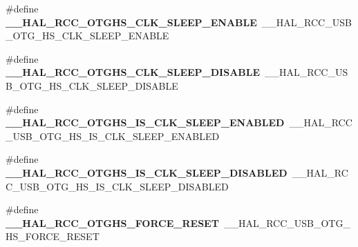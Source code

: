 \begin{DoxyCompactItemize}
\item 
\#define {\bfseries \+\_\+\+\_\+\+H\+A\+L\+\_\+\+R\+C\+C\+\_\+\+O\+T\+G\+H\+S\+\_\+\+C\+L\+K\+\_\+\+S\+L\+E\+E\+P\+\_\+\+E\+N\+A\+B\+LE}~\+\_\+\+\_\+\+H\+A\+L\+\_\+\+R\+C\+C\+\_\+\+U\+S\+B\+\_\+\+O\+T\+G\+\_\+\+H\+S\+\_\+\+C\+L\+K\+\_\+\+S\+L\+E\+E\+P\+\_\+\+E\+N\+A\+B\+LE\hypertarget{group___h_a_l___r_c_c___aliased_ga33ebf3c332b4cc9093720cd9959a57c3}{}\label{group___h_a_l___r_c_c___aliased_ga33ebf3c332b4cc9093720cd9959a57c3}

\item 
\#define {\bfseries \+\_\+\+\_\+\+H\+A\+L\+\_\+\+R\+C\+C\+\_\+\+O\+T\+G\+H\+S\+\_\+\+C\+L\+K\+\_\+\+S\+L\+E\+E\+P\+\_\+\+D\+I\+S\+A\+B\+LE}~\+\_\+\+\_\+\+H\+A\+L\+\_\+\+R\+C\+C\+\_\+\+U\+S\+B\+\_\+\+O\+T\+G\+\_\+\+H\+S\+\_\+\+C\+L\+K\+\_\+\+S\+L\+E\+E\+P\+\_\+\+D\+I\+S\+A\+B\+LE\hypertarget{group___h_a_l___r_c_c___aliased_ga3e46182659039e69ad95eada6df0261e}{}\label{group___h_a_l___r_c_c___aliased_ga3e46182659039e69ad95eada6df0261e}

\item 
\#define {\bfseries \+\_\+\+\_\+\+H\+A\+L\+\_\+\+R\+C\+C\+\_\+\+O\+T\+G\+H\+S\+\_\+\+I\+S\+\_\+\+C\+L\+K\+\_\+\+S\+L\+E\+E\+P\+\_\+\+E\+N\+A\+B\+L\+ED}~\+\_\+\+\_\+\+H\+A\+L\+\_\+\+R\+C\+C\+\_\+\+U\+S\+B\+\_\+\+O\+T\+G\+\_\+\+H\+S\+\_\+\+I\+S\+\_\+\+C\+L\+K\+\_\+\+S\+L\+E\+E\+P\+\_\+\+E\+N\+A\+B\+L\+ED\hypertarget{group___h_a_l___r_c_c___aliased_gadad70bfa003e6cd32f8d16102216c02e}{}\label{group___h_a_l___r_c_c___aliased_gadad70bfa003e6cd32f8d16102216c02e}

\item 
\#define {\bfseries \+\_\+\+\_\+\+H\+A\+L\+\_\+\+R\+C\+C\+\_\+\+O\+T\+G\+H\+S\+\_\+\+I\+S\+\_\+\+C\+L\+K\+\_\+\+S\+L\+E\+E\+P\+\_\+\+D\+I\+S\+A\+B\+L\+ED}~\+\_\+\+\_\+\+H\+A\+L\+\_\+\+R\+C\+C\+\_\+\+U\+S\+B\+\_\+\+O\+T\+G\+\_\+\+H\+S\+\_\+\+I\+S\+\_\+\+C\+L\+K\+\_\+\+S\+L\+E\+E\+P\+\_\+\+D\+I\+S\+A\+B\+L\+ED\hypertarget{group___h_a_l___r_c_c___aliased_gaf3cd4d85b55fc5bfd19d839d315eaa80}{}\label{group___h_a_l___r_c_c___aliased_gaf3cd4d85b55fc5bfd19d839d315eaa80}

\item 
\#define {\bfseries \+\_\+\+\_\+\+H\+A\+L\+\_\+\+R\+C\+C\+\_\+\+O\+T\+G\+H\+S\+\_\+\+F\+O\+R\+C\+E\+\_\+\+R\+E\+S\+ET}~\+\_\+\+\_\+\+H\+A\+L\+\_\+\+R\+C\+C\+\_\+\+U\+S\+B\+\_\+\+O\+T\+G\+\_\+\+H\+S\+\_\+\+F\+O\+R\+C\+E\+\_\+\+R\+E\+S\+ET\hypertarget{group___h_a_l___r_c_c___aliased_gaba098ab8f27b638745864ad795ac250a}{}\label{group___h_a_l___r_c_c___aliased_gaba098ab8f27b638745864ad795ac250a}


\end{DoxyCompactItemize}
